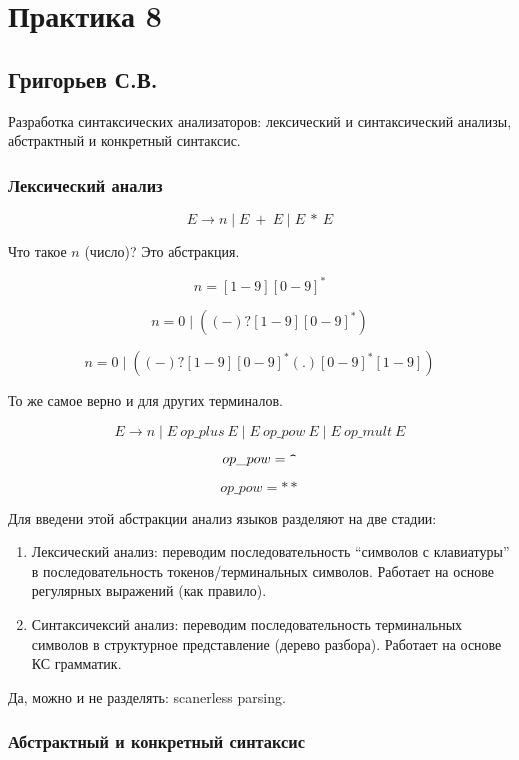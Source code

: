 \section{Практика 8}

\subsection{Григорьев С.В.}

Разработка синтаксических анализаторов: лексический и синтаксический анализы, абстрактный и конкретный синтаксис.

\subsubsection{Лексический анализ}

$$
E \to n \mid E \ + \ E \mid E \ * \ E 
$$

Что такое $n$ (число)? Это абстракция.

$$
n = [1-9][0-9]^*
$$

$$
n = 0 \mid ((-)?[1-9][0-9]^*)
$$

$$
n = 0 \mid ((-)?[1-9][0-9]^*(.)[0-9]^*[1-9])
$$

То же самое верно и для других терминалов.

$$
E \to n \mid E \ op\_plus \ E \mid E \ op\_pow \ E \mid E \ op\_mult \ E 
$$

$$
op\_pow = \verb|^|
$$


$$
op\_pow = **
$$

Для введени этой абстракции анализ языков разделяют на две стадии: 
\begin{enumerate}
	\item Лексический анализ: переводим последовательность ``символов с клавиатуры'' в последовательность токенов/терминальных символов. Работает на основе регулярных выражений (как правило).

	\item Синтаксичексий анализ: переводим последовательность терминальных символов в структурное представление (дерево разбора). Работает на основе КС грамматик.
\end{enumerate}


Да, можно и не разделять: scanerless parsing.


\subsubsection{Абстрактный и конкретный синтаксис}

